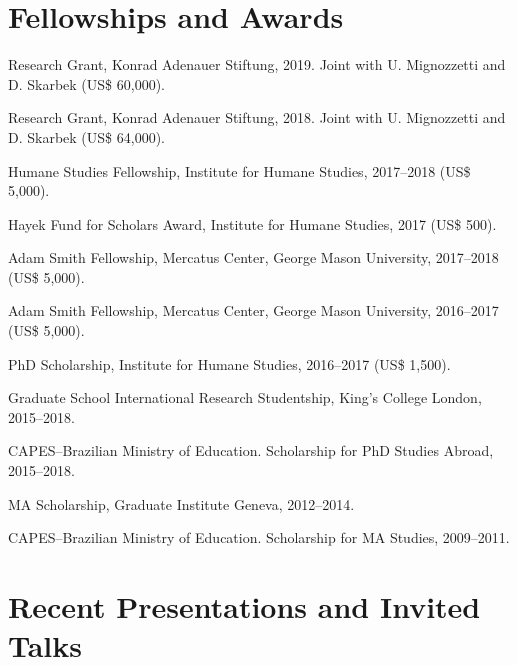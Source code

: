 \documentclass[a4paper]{article}
\renewenvironment{itemize}{
	\begin{list}{}{
			\setlength{\leftmargin}{1.5em}
		}
		}{
	\end{list}
}
\begin{document}
	\section*{Fellowships and Awards}

	\begin{itemize}
		\item Research Grant, Konrad Adenauer Stiftung, 2019. Joint with U. Mignozzetti and D. Skarbek (US\$ 60,000).
		\item Research Grant, Konrad Adenauer Stiftung, 2018. Joint with U. Mignozzetti and D. Skarbek (US\$ 64,000).
		\item Humane Studies Fellowship, Institute for Humane Studies, 2017--2018 (US\$ 5,000).
		\item Hayek Fund for Scholars Award, Institute for Humane Studies, 2017 (US\$ 500).
		\item Adam Smith Fellowship, Mercatus Center, George Mason University, 2017--2018 (US\$ 5,000).
		\item Adam Smith Fellowship, Mercatus Center, George Mason University, 2016--2017 (US\$ 5,000).
		\item PhD Scholarship, Institute for Humane Studies, 2016--2017 (US\$ 1,500).
		\item Graduate School International Research Studentship, King's College London, 2015--2018.
		\item CAPES--Brazilian Ministry of Education. Scholarship for PhD Studies Abroad, 2015--2018.
		\item MA Scholarship, Graduate Institute Geneva, 2012--2014.
		\item CAPES--Brazilian Ministry of Education. Scholarship for MA Studies, 2009--2011.
	\end{itemize}

	\section*{Recent Presentations and Invited Talks}
\end{document}
